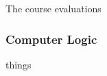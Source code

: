 \documentclass[../../main.tex]{subfiles}
\begin{document}
The course evaluations

\subsubsection{Computer Logic}

things
\end{document}
